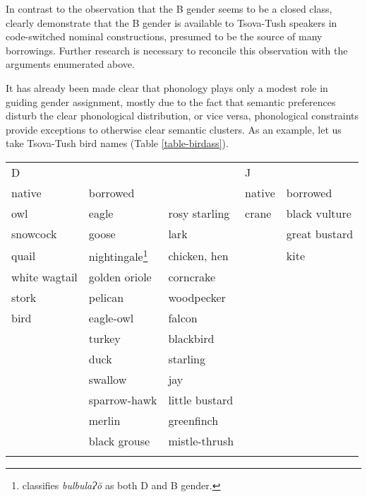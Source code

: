 In contrast to the observation that the B gender seems to be a closed class, \textcite{bellamyWS} clearly demonstrate that the B gender is available to Tsova-Tush speakers in code-switched nominal constructions, presumed to be the source of many borrowings. Further research is necessary to reconcile this observation with the arguments enumerated above.

It has already been made clear that phonology plays only a modest role in guiding gender assignment, mostly due to the fact that semantic preferences disturb the clear phonological distribution, or vice versa, phonological constraints provide exceptions to otherwise clear semantic clusters. As an example, let us take Tsova-Tush bird names (Table \ref{table-birdass}). 

\begin{table}
	\begin{tabular}{lllll}
	\lsptoprule
	D & & & J & \\
	native & {borrowed} & & {native} & {borrowed} \\
    \midrule
	owl & eagle & rosy starling & crane & black vulture \\
	
	snowcock & goose & lark & & great bustard \\
	
	quail & nightingale\footnote{\cite{kadkad84} classifies \textit{bulbulaɁ\u{o}} as both D and B gender.} & chicken, hen & & kite \\
	
	white wagtail & golden oriole & corncrake & & \\
	
	stork & pelican & woodpecker & & \\
	
	bird & eagle-owl & falcon & & \\
	
	& turkey & blackbird & & \\
	& duck & starling & & \\
	& swallow & jay & & \\
	& sparrow-hawk & little bustard & & \\
	
	& merlin & greenfinch & & \\
	& black grouse & mistle-thrush & & \\\addlinespace
	

\end{tabular}
\end{table}
